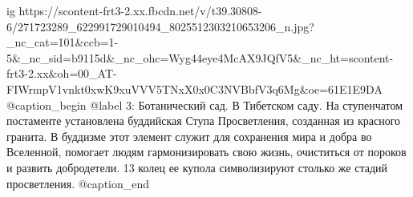  
 
 
 
 

\ifcmt
  ig https://scontent-frt3-2.xx.fbcdn.net/v/t39.30808-6/271723289_622991729010494_8025512303210653206_n.jpg?_nc_cat=101&ccb=1-5&_nc_sid=b9115d&_nc_ohc=Wyg44eye4McAX9JQfV5&_nc_ht=scontent-frt3-2.xx&oh=00_AT-FIWrmpV1vnkt0xwK9xuVVV5TNxX0x0C3NVBbfV3q6Mg&oe=61E1E9DA
	@caption_begin
		@label 3:
Ботанический сад. В Тибетском саду. На ступенчатом постаменте установлена
буддийская Ступа Просветления, созданная из красного гранита. В буддизме этот
элемент служит для сохранения мира и добра во Вселенной, помогает людям
гармонизировать свою жизнь, очиститься от пороков и развить добродетели. 13
колец ее купола символизируют столько же стадий просветления.	  
	@caption_end
\fi
